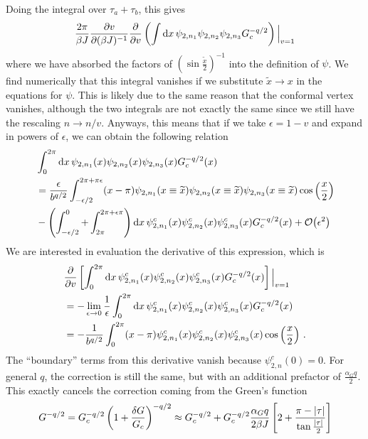 \documentclass[aps,prx,preprint,onecolumn,citeautoscript,footinbib]{revtex4-1}
\renewcommand{\tilde}{\widetilde}
\begin{document}
Doing the integral over $\tau_a + \tau_b$, this gives
\begin{equation}
    \frac{2\pi}{\beta J} \pdv{v}{(\beta J)^{-1}} \pdv{v}\left( \int \dd{x}  \psi_{2, n_1} \psi_{2, n_2} \psi_{2, n_3} G_c^{-q/2}\right) \Big|_{v=1}
\end{equation}
where we have absorbed the factors of $\left(\sin\frac{\tilde{x}}{2}\right)^{-1}$ into the definition of $\psi$. We find numerically that this integral vanishes if we substitute $\tilde{x} \rightarrow x$ in the equations for $\psi$. This is likely due to the same reason that the conformal vertex vanishes, although the two integrals are not exactly the same since we still have the rescaling $n \rightarrow n/v$. 
Anyways, this means that if we take $\epsilon = 1-v$ and expand in powers of $\epsilon$, we can obtain the following relation
\begin{equation*}
  \begin{aligned}
    &\int_0^{2\pi} \dd{x}  \psi_{2, n_1}(x) \psi_{2, n_2}(x) \psi_{2, n_3}(x) G_c^{-q/2}(x) 
    \\
    &= \frac{\epsilon}{b^{q/2}} \int_{-\epsilon/2}^{2\pi + \pi \epsilon} (x-\pi) \psi_{2, n_1}(x \equiv \tilde{x}) \psi_{2, n_2}(x \equiv \tilde{x})\psi_{2, n_3}(x \equiv \tilde{x})  \cos\left( \frac{x}{2} \right) 
  \\
  &- \left( \int_{-\epsilon/2}^0 + \int_{2\pi}^{2\pi + \epsilon \pi} \right) \dd{x}\psi^c_{2, n_1}(x) \psi_{2, n_2}^c(x)\psi_{2, n_3}^{c}(x)  G_c^{-q/2}(x) + \order{\epsilon^2}
\end{aligned}
\end{equation*}
We are interested in evaluation the derivative of this expression, which is
\begin{equation*}
  \begin{aligned}
    &\pdv{v} \left[\int_0^{2\pi} \dd{x} \psi^c_{2, n_1}(x) \psi_{2, n_2}^c(x)\psi_{2, n_3}^{c}(x)  G_c^{-q/2}(x)\right]\Big|_{v=1} 
    \\
    &= -\lim_{\epsilon \rightarrow 0} \frac{1}{\epsilon}\int_0^{2\pi} \dd{x} \psi^c_{2, n_1}(x) \psi_{2, n_2}^c(x)\psi_{2, n_3}^{c}(x)  G_c^{-q/2}(x) 
    \\
    &= - \frac{1}{b^{q/2}} \int_{0}^{2\pi} (x-\pi) \psi^c_{2, n_1}(x) \psi_{2, n_2}^c(x)\psi_{2, n_3}^{c}(x)  \cos\left( \frac{x}{2} \right)\,.
  \end{aligned}
\end{equation*}
The ``boundary'' terms from this derivative vanish because $\psi^c_{2, n}(0) = 0$. For general $q$, the correction is still the same, but with an additional prefactor of $\frac{\alpha_G q}{2}$. This exactly cancels the correction coming from the Green's function
\begin{equation}
    G^{-q/2} = G_c^{-q/2} \left(1 + \frac{\delta G}{G_c}\right)^{-q/2} \approx G_c^{-q/2} + G_c^{-q/2}\frac{\alpha_G q}{2\beta J} \left[2 + \frac{\pi - \abs{\tau}}{\tan{\frac{\abs{\tau}}{2}}}\right] 
\end{equation}
\end{document}
